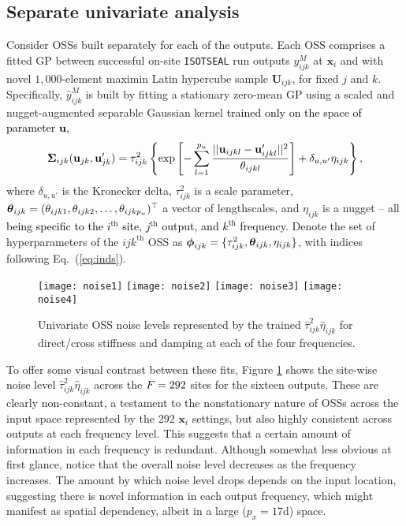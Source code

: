 \documentclass[12pt]{article}
\newcommand{\blu}[1]{\textcolor{black}{#1}} %
\newcommand{\blunew}[1]{\textcolor{black}{#1}} %
\newcommand{\bm}[1]{\mbox{\boldmath $#1$}}
\begin{document}
\subsection{Separate univariate analysis}   %
\label{sec:unioss}

Consider OSSs built separately for each of the outputs. Each OSS
comprises a fitted GP between successful on-site {\tt ISOTSEAL} run
outputs $y^M_{ijk}$ at $\mathbf{x}_i$ and with novel $1{,}000$-element maximin
Latin hypercube sample \citep[LHS;][]{morris:1995} $\mathbf{U}_{ijk}$, for
fixed $j$ and $k$. Specifically, $\hat{y}^M_{ijk}$ is built by fitting a
stationary zero-mean GP using a scaled and nugget-augmented separable Gaussian
kernel \blu{trained only on the space of parameter $\mathbf{u}$, }
\begin{align}
\blu{\blunew{\mathbf{\Sigma}}_{ijk}(\mathbf{u}_{jk}, \mathbf{u}_{jk}') = \tau_{ijk}^2 \left\{ \exp \left[  - \sum_{l=1}^{p_u} 
\frac{||\mathbf{u}_{ijkl} - \mathbf{u}'_{ijkl}||^2}{\theta_{ijkl}}  \right]   + \delta_{u,u'} \eta_{ijk} \right\},  }
 \label{eq:kernel}
\end{align}
where $\delta_{u,u'}$ is the
 Kronecker delta, $\tau_{ijk}^2$ is a scale parameter, $\bm{\theta}_{ijk}=(\theta_{ijk1},
\theta_{ijk2},  \dots, \theta_{ijkp_u} )^\top$ a vector of 
lengthscales, and $\eta_{ijk}$ is a nugget -- all \blu{being specific to the
$i^\mathrm{th}$ site, $j^\mathrm{th}$ output, and $k^\mathrm{th}$ frequency}.
Denote the set of hyperparameters of the $ijk^\mathrm{th}$ OSS as
$\bm{\phi}_{ijk}=\{\tau^2_{ijk},
\bm{\theta}_{ijk}, \eta_{ijk}\}$, with indices following Eq.~(\ref{eq:inds}).

\begin{figure}[ht!]
\centering
\texttt{[image: noise1]}
\texttt{[image: noise2]}
\texttt{[image: noise3]}
\texttt{[image: noise4]}
\caption{Univariate OSS noise levels 
represented by the trained $\hat{\tau}_{ijk}^2 \hat{\eta}_{ijk}$ 
for direct/cross stiffness and damping at each of the four frequencies.}
\label{fig:noise1}%
\end{figure}

To offer some visual contrast between these fits, Figure \ref{fig:noise1}
shows the site-wise noise level $\hat{\tau}_{ijk}^2 \hat{\eta}_{ijk}$ across
the $\blunew{F}=292$ sites for the sixteen outputs. These are clearly non-constant, a
testament to the nonstationary nature of OSSs across the input space
represented by the 292 $\mathbf{x}_i$ settings, but also highly consistent
across outputs at each frequency level. This suggests that a certain amount of
information in each frequency is redundant. Although somewhat less obvious at
first glance, notice that the overall noise level decreases as the frequency
increases.  The amount by which noise level drops depends on the input
location, suggesting there is novel information in each output frequency,
which might manifest as spatial dependency, albeit in a large ($p_x =
17$d) space.
\end{document}
